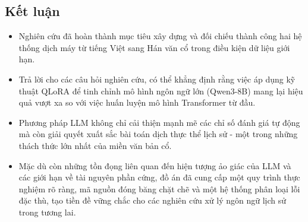\subsection{Kết luận}
\begin{itemize}
\item Nghiên cứu đã hoàn thành mục tiêu xây dựng và đối chiếu thành công hai hệ thống dịch máy từ tiếng Việt sang Hán văn cổ trong điều kiện dữ liệu giới hạn.  

\item Trả lời cho các câu hỏi nghiên cứu, có thể khẳng định rằng việc áp dụng kỹ thuật QLoRA để tinh chỉnh mô hình ngôn ngữ lớn (Qwen3-8B) mang lại hiệu quả vượt xa so với việc huấn luyện mô hình Transformer từ đầu.  

\item Phương pháp LLM không chỉ cải thiện mạnh mẽ các chỉ số đánh giá tự động mà còn giải quyết xuất sắc bài toán dịch thực thể lịch sử - một trong những thách thức lớn nhất của miền văn bản cổ.  

\item Mặc dù còn những tồn đọng liên quan đến hiện tượng ảo giác của LLM và các giới hạn về tài nguyên phần cứng, đồ án đã cung cấp một quy trình thực nghiệm rõ ràng, mã nguồn đóng băng chặt chẽ và một hệ thống phân loại lỗi đặc thù, tạo tiền đề vững chắc cho các nghiên cứu xử lý ngôn ngữ lịch sử trong tương lai.
\end{itemize}